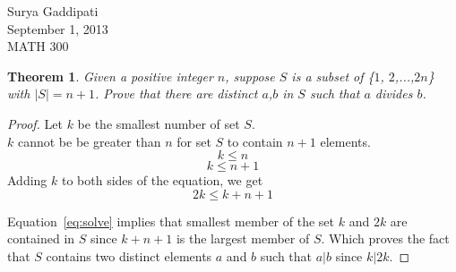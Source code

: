 \documentclass[12pt]{article}
\begin{document}
 

Surya Gaddipati\\
September 1, 2013\\
MATH 300 

\newtheorem*{KL}{Theorem }

\begin{KL} 
Given a positive integer $n$, suppose $S$ is a subset of \{$1$, $2$,...,$2n$\} with $|S| = n + 1$. Prove that there are distinct $a$,$b$ in $S$ such that $a$ divides $b$.
\end{KL}
\begin{proof}
  Let $k$ be the smallest number of set $S$.\\
  $k$ cannot be be greater than $n$ for set $S$ to contain $n+1$ elements.
  \begin{equation}
    k \leq n  
  \end{equation}
  \begin{equation}
    k \leq n + 1
  \end{equation}
  Adding $k$ to both sides of the equation, we get 
  \begin{equation}\label{eq:solve}
    2k \leq k+ n + 1
  \end{equation}

  Equation~\ref{eq:solve} implies that smallest member of the set $k$ and $2k$ are contained in $S$ since $k+n+1$ is the largest member of $S$. Which proves the fact that $S$ contains two distinct elements $a$ and $b$ such that $a|b$ since $k|2k$. 

\end{proof}
\end{document}
